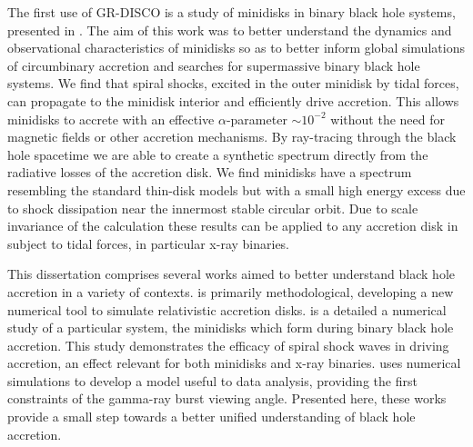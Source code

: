 The first use of GR-DISCO is a study of minidisks in binary black hole systems, presented in .  The aim of this work was to better understand the dynamics and observational characteristics of minidisks so as to better inform global simulations of circumbinary accretion and searches for supermassive binary black hole systems.  We find that spiral shocks, excited in the outer minidisk by tidal forces, can propagate to the minidisk interior and efficiently drive accretion.  This allows minidisks to accrete with an effective $\alpha$-parameter $\sim 10^{-2}$ without the need for magnetic fields or other accretion mechanisms.  By ray-tracing through the black hole spacetime we are able to create a synthetic spectrum directly from the radiative losses of the accretion disk.  We find minidisks have a spectrum resembling the standard thin-disk models but with a small high energy excess due to shock dissipation near the innermost stable circular orbit.  Due to scale invariance of the calculation these results can be applied to any accretion disk in subject to tidal forces, in particular x-ray binaries.  


This dissertation comprises several works aimed to better understand black hole accretion in a variety of contexts.   is primarily methodological, developing a new numerical tool to simulate relativistic accretion disks.   is a detailed a numerical study of a particular system, the minidisks which form during binary black hole accretion.  This study demonstrates the efficacy of spiral shock waves in driving accretion, an effect relevant for both minidisks and x-ray binaries.   uses numerical simulations to develop a model useful to data analysis, providing the first constraints of the gamma-ray burst viewing angle.  Presented here, these works provide a small step towards a better unified understanding of black hole accretion.

